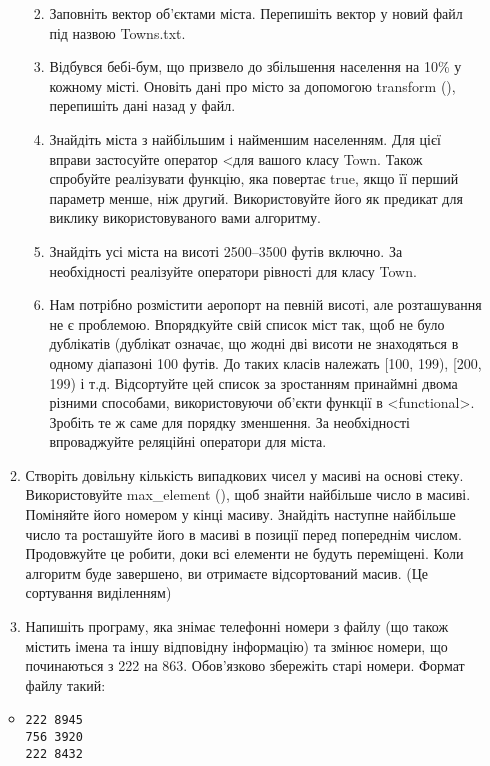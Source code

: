 \documentclass[]{article}
\begin{document}
\begin{enumerate}
\begin{enumerate}
  \begin{enumerate}
  \def\labelenumii{\arabic{enumii}.}
  \item
    Заповніть вектор об'єктами міста. Перепишіть вектор у новий файл під
    назвою Towns.txt.
  \item
    Відбувся бебі-бум, що призвело до збільшення населення на 10\% у
    кожному місті. Оновіть дані про місто за допомогою transform (),
    перепишіть дані назад у файл.
  \item
    Знайдіть міста з найбільшим і найменшим населенням. Для цієї вправи
    застосуйте оператор \textless{}для вашого класу Town. Також
    спробуйте реалізувати функцію, яка повертає true, якщо її перший
    параметр менше, ніж другий. Використовуйте його як предикат для
    виклику використовуваного вами алгоритму.
  \item
    Знайдіть усі міста на висоті 2500--3500 футів включно. За
    необхідності реалізуйте оператори рівності для класу Town.
  \item
    Нам потрібно розмістити аеропорт на певній висоті, але розташування
    не є проблемою. Впорядкуйте свій список міст так, щоб не було
    дублікатів (дублікат означає, що жодні дві висоти не знаходяться в
    одному діапазоні 100 футів. До таких класів належать {[}100, 199),
    {[}200, 199) і т.д. Відсортуйте цей список за зростанням принаймні
    двома різними способами, використовуючи об'єкти функції в
    \textless{}functional\textgreater{}. Зробіть те ж саме для порядку
    зменшення. За необхідності впроваджуйте реляційні оператори для
    міста.
  \end{enumerate}
\item
  Створіть довільну кількість випадкових чисел у масиві на основі стеку.
  Використовуйте max\_element (), щоб знайти найбільше число в масиві.
  Поміняйте його номером у кінці масиву. Знайдіть наступне найбільше
  число та росташуйте його в масиві в позиції перед попереднім числом.
  Продовжуйте це робити, доки всі елементи не будуть переміщені. Коли
  алгоритм буде завершено, ви отримаєте відсортований масив. (Це
  сортування виділенням)
\item
  Напишіть програму, яка знімає телефонні номери з файлу (що також
  містить імена та іншу відповідну інформацію) та змінює номери, що
  починаються з 222 на 863. Обов'язково збережіть старі номери. Формат
  файлу такий:
\end{enumerate}

\begin{itemize}
\item
\begin{verbatim}
222 8945
756 3920
222 8432
\end{verbatim}


\end{itemize}
\end{enumerate}
\end{document}
